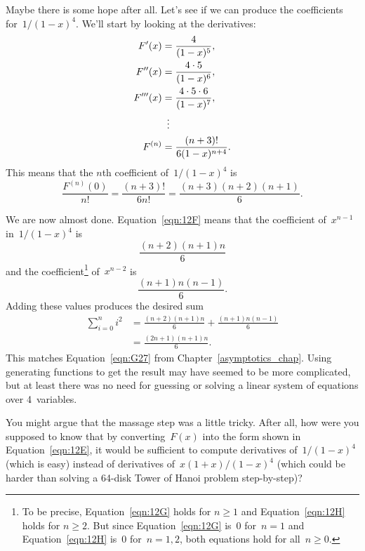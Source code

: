 Maybe there is some hope after all.  Let's see if we can produce the
coefficients for~$1/(1 - x)^4$.  We'll start by looking at the
derivatives:
\begin{align*}
F'(x)       &= \frac{4}{(1 - x)^5}, \\
F''(x)      &= \frac{4 \cdot 5}{(1 - x)^6}, \\
F'''(x)     &= \frac{4 \cdot 5 \cdot 6}{(1 - x)^7}, \\
            &\enskip \vdots \\
F^{(n)}     &= \frac{(n + 3)!}{ 6 (1 - x)^{n+4} }.
\end{align*}
This means that the $n$th coefficient of~$1/(1 - x)^4$ is
\begin{equation}
\frac{F^{(n)}(0)}{n!}
    = \frac{(n + 3)!}{6 n!} 
    = \frac{(n + 3) (n + 2) (n + 1)}{6}. \label{eqn:12F}
\end{equation}

We are now almost done.  Equation~\ref{eqn:12F} means that the
coefficient of~$x^{n - 1}$ in~$1/(1 - x)^4$ is
\begin{equation}\label{eqn:12G}
    \frac{(n + 2) (n + 1) n}{6}
\end{equation}
and the coefficient\footnote{To be precise, Equation~\ref{eqn:12G}
  holds for $n \ge 1$ and Equation~\ref{eqn:12H} holds for $n \ge 2$.
  But since Equation~\ref{eqn:12G} is~0 for~$n = 1$ and
  Equation~\ref{eqn:12H} is~0 for~$n = 1, 2$, both equations hold for
  all~$n \ge 0$.}  of~$x^{n - 2}$ is
\begin{equation}\label{eqn:12H}
    \frac{(n + 1) n (n - 1)}{6}.
\end{equation}
Adding these values produces the desired sum
\begin{align*}
\sum_{i = 0}^n i^2
    &= \frac{(n + 2) (n + 1) n}{6} + \frac{(n + 1) n (n - 1)}{6} \\
    &= \frac{ (2n + 1) (n + 1) n }{6}.
\end{align*}
This matches Equation~\ref{eqn:G27} from
Chapter~\ref{asymptotics_chap}.  Using generating functions to get the
result may have seemed to be more complicated, but at least there was
no need for guessing or solving a linear system of equations over
4~variables.

You might argue that the massage step was a little tricky.  After all,
how were you supposed to know that by converting~$F(x)$ into the form
shown in Equation~\ref{eqn:12E}, it would be sufficient to compute
derivatives of~$1/(1 - x)^4$ (which is easy) instead of derivatives
of~$x (1 + x) / (1 - x)^4$ (which could be harder than solving a
64-disk Tower of Hanoi problem step-by-step)?

